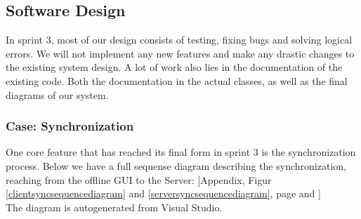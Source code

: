 \subsection{Software Design}
In sprint 3, most of our design consists of testing, fixing bugs and solving logical errors. We will not implement any new features and make any drastic changes to the existing system design. A lot of work also lies in the documentation of the existing code. Both the documentation in the actual classes, as well as the final diagrams of our system. 
\subsubsection{Case: Synchronization}
One core feature that has reached its final form in sprint 3 is the synchronization process. Below we have a full sequense diagram describing the synchronization, reaching from the offline GUI to the Server:
[Appendix, Figur \ref{clientsyncsequencediagram} and \ref{serversyncsequencediagram}, page \pageref{clientsyncsequencediagram} and \pageref{serversyncsequencediagram}]\\
The diagram is autogenerated from Visual Studio. 

